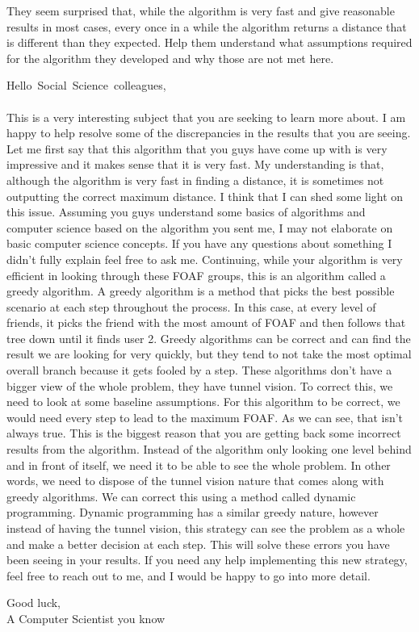 \documentclass[12pt]{article}
\begin{document}
\pagebreak
They seem surprised that, while the algorithm is very fast and give reasonable
results in most cases, every once in a while the algorithm returns a distance
that is different than they expected. Help them understand what assumptions
required for the algorithm they developed and why those are not met here.

\pagebreak

\newpage
\mbox{Hello Social Science colleagues,}
\\ \\ This is a very interesting subject that you are seeking to learn more about. I am happy to help resolve some of the discrepancies in the results that you are seeing. Let me first say that this algorithm that you guys have come up with is very impressive and it makes sense that it is very fast. My understanding is that, although the algorithm is very fast in finding a distance, it is sometimes not outputting the correct maximum distance. I think that I can shed some light on this issue. Assuming you guys understand some basics of algorithms and computer science based on the algorithm you sent me, I may not elaborate on basic computer science concepts. If you have any questions about something I didn't fully explain feel free to ask me. Continuing, while your algorithm is very efficient in looking through these FOAF groups, this is an algorithm called a greedy algorithm. A greedy algorithm is a method that picks the best possible scenario at each step throughout the process. In this case, at every level of friends, it picks the friend with the most amount of FOAF and then follows that tree down until it finds user 2. Greedy algorithms can be correct and can find the result we are looking for very quickly, but they tend to not take the most optimal overall branch because it gets fooled by a step. These algorithms don't have a bigger view of the whole problem, they have tunnel vision. To correct this, we need to look at some baseline assumptions. For this algorithm to be correct, we would need every step to lead to the maximum FOAF. As we can see, that isn't always true. This is the biggest reason that you are getting back some incorrect results from the algorithm. Instead of the algorithm only looking one level behind and in front of itself, we need it to be able to see the whole problem. In other words, we need to dispose of the tunnel vision nature that comes along with greedy algorithms. We can correct this using a method called dynamic programming. Dynamic programming has a similar greedy nature, however instead of having the tunnel vision, this strategy can see the problem as a whole and make a better decision at each step. This will solve these errors you have been seeing in your results. If you need any help implementing this new strategy, feel free to reach out to me, and I would be happy to go into more detail.

Good luck, \\
A Computer Scientist you know 


\newpage
\pagebreak
\end{document}
